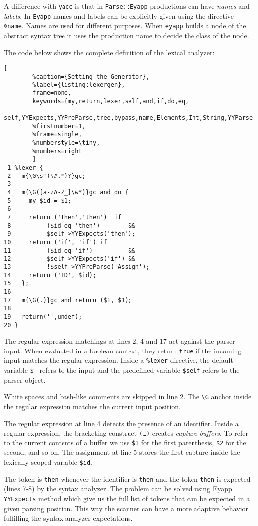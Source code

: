 A difference with \verb|yacc| is that
in \verb|Parse::Eyapp| productions can have {\it names} and {\it labels}. 
In \verb|Eyapp| names and labels can be 
explicitly given using the directive \verb|%name|.
Names are used for different purposes.
When \verb|eyapp| builds a node of the abstract syntax tree
it uses the production name to decide the class 
of the node.

The code below 
shows the complete definition of the lexical analyzer:
\begin{lstlisting}[
        %caption={Setting the Generator}, 
        %label={listing:lexergen}, 
        frame=none,
        keywords={my,return,lexer,self,and,if,do,eq,
        self,YYExpects,YYPreParse,tree,bypass,name,Elements,Int,String,YYParse,LexerGen,Gen},
        %firstnumber=1, 
        %frame=single,
        %numberstyle=\tiny,
        %numbers=right
        ]
 1 %lexer {
 2   m{\G\s*(\#.*)?}gc;
 3 
 4   m{\G([a-zA-Z_]\w*)}gc and do {
 5     my $id = $1;
 6 
 7     return ('then','then')  if
 8          ($id eq 'then')        && 
 9          $self->YYExpects('then');
10     return ('if', 'if') if 
11          ($id eq 'if')          && 
12          $self->YYExpects('if') &&
13          !$self->YYPreParse('Assign');   
14     return ('ID', $id);
15   };
16 
17   m{\G(.)}gc and return ($1, $1);
18 
19   return('',undef);
20 }
\end{lstlisting}

The regular expression matchings 
at lines 2, 4 and 17 act against the parser 
input. 
When evaluated in a boolean context,
they return \verb|true| if the incoming input
matches the regular expression. 
Inside a \verb|%lexer| directive,
the default variable \verb|$_| refers to the 
input and the predefined
variable \verb|$self| refers to the parser object.

White spaces and bash-like comments are skipped in line 2.
The \verb|\G| anchor inside the regular expression 
matches the current input position.

The regular expression at line 4 detects the presence of
an identifier. 
Inside a regular expression, the bracketing construct 
\mbox{\tt(\ldots)}
creates {\it capture buffers}. To refer to the current contents of a
buffer we use \verb|$1| for the first parenthesis, \verb|$2|
for the second, and so on. The assignment at line 5
stores the first capture inside the lexically scoped variable \verb|$id|.


The token is \verb|then| whenever 
the identifier is \verb|then|
and the token \verb|then| is expected (lines 7-8) by
the syntax analyzer.
The problem can be solved using Eyapp \verb|YYExpects| method
which give us the full list of tokens that can be expected in a given 
parsing position. This way the scanner 
can have a more adaptive behavior fulfilling the syntax analyzer expectations.

